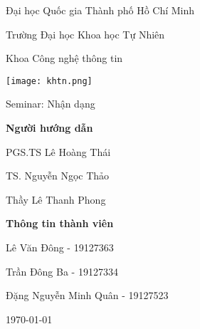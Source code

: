 
\begin{titlepage}
    \begin{center}
        \Large
        Đại học Quốc gia Thành phố Hồ Chí Minh

        \Large
        Trường Đại học Khoa học Tự Nhiên

        \Large
        Khoa Công nghệ thông tin

        \vspace*{1cm}

        \texttt{[image: khtn.png]}
        
        \Huge
        Seminar: Nhận dạng %
        \vspace*{0.5cm}

        \large
        \textbf{Người hướng dẫn}

        PGS.TS Lê Hoàng Thái

        TS. Nguyễn Ngọc Thảo

        Thầy Lê Thanh Phong
        
        \vspace*{0.3cm}
        \textbf{Thông tin thành viên}

        \large
        Lê Văn Đông - 19127363

        Trần Đông Ba - 19127334

        Đặng Nguyễn Minh Quân - 19127523

        \vfill

        \today

    \end{center}
\end{titlepage}